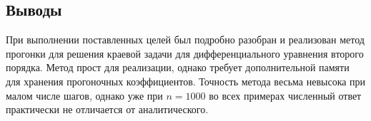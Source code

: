 \documentclass[a4paper,12pt,titlepage,finall]{article}
\begin{document}
\subsection{Выводы}
При выполнении поставленных целей был подробно разобран и реализован метод прогонки для решения краевой задачи для дифференциального уравнения второго порядка. Метод прост для реализации, однако требует дополнительной памяти для хранения прогоночных коэффициентов. Точность метода весьма невысока при малом числе шагов, однако уже при $n = 1000$ во всех примерах численный ответ практически не отличается от аналитического.
\end{document}
